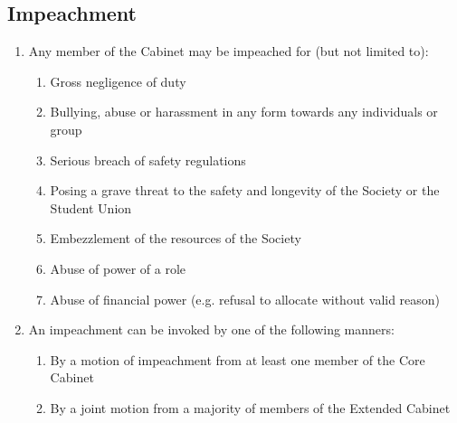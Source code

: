 \documentclass[parskip=half]{scrartcl}
\begin{document}
        \subsection{Impeachment}
            \label{executive--impeachment}
            \begin{enumerate}
                \item Any member of the Cabinet may be impeached for (but not limited to):
                    \begin{enumerate}
                        \item Gross negligence of duty
                        
                        \item Bullying, abuse or harassment in any form towards any individuals or group

                        \item Serious breach of safety regulations
                        
                        \item Posing a grave threat to the safety and longevity of the Society or the Student Union
                        
                        \item Embezzlement of the resources of the Society
                        
                        \item Abuse of power of a role
                        
                        \item Abuse of financial power (e.g. refusal to allocate without valid reason)
                    \end{enumerate}
                \item An impeachment can be invoked by one of the following manners:
                    \begin{enumerate}
                        \item By a motion of impeachment from at least one member of the Core Cabinet
                        
                        \item By a joint motion from a majority of members of the Extended Cabinet
                        

\end{enumerate}
\end{enumerate}
\end{document}
